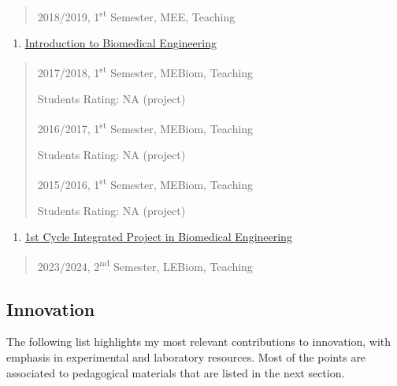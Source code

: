 \begin{quote}
2018/2019, 1\textsuperscript{st} Semester, MEE, Teaching
\end{quote}

\begin{enumerate}
\def\labelenumi{\arabic{enumi}.}
\setcounter{enumi}{27}
\item
  \ul{Introduction to Biomedical Engineering}
\end{enumerate}

\begin{quote}
2017/2018, 1\textsuperscript{st} Semester, MEBiom, Teaching

Students Rating: NA (project)

2016/2017, 1\textsuperscript{st} Semester, MEBiom, Teaching

Students Rating: NA (project)

2015/2016, 1\textsuperscript{st} Semester, MEBiom, Teaching

Students Rating: NA (project)
\end{quote}

\begin{enumerate}
\def\labelenumi{\arabic{enumi}.}
\setcounter{enumi}{28}
\item
  \ul{1st Cycle Integrated Project in Biomedical Engineering}
\end{enumerate}

\begin{quote}
2023/2024, 2\textsuperscript{nd} Semester, LEBiom, Teaching
\end{quote}

\subsection{Innovation}\label{innovation}

The following list highlights my most relevant contributions to
innovation, with emphasis in experimental and laboratory resources. Most
of the points are associated to pedagogical materials that are listed in
the next section.

